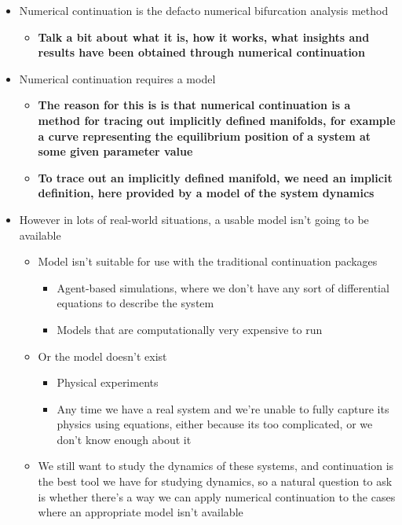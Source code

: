 \documentclass[11pt]{article}
\begin{document}
\begin{itemize}
\item Numerical continuation is the defacto numerical bifurcation analysis method
\begin{itemize}
\item \textbf{Talk a bit about what it is, how it works, what insights and results have been obtained through numerical continuation}
\end{itemize}
\item Numerical continuation requires a model
\begin{itemize}
\item \textbf{The reason for this is is that numerical continuation is a method for tracing out implicitly defined manifolds, for example a curve representing the equilibrium position of a system at some given parameter value}
\item \textbf{To trace out an implicitly defined manifold, we need an implicit definition, here provided by a model of the system dynamics}
\end{itemize}
\item However in lots of real-world situations, a usable model isn't going to be available
\begin{itemize}
\item Model isn't suitable for use with the traditional continuation packages
\begin{itemize}
\item Agent-based simulations, where we don't have any sort of differential equations to describe the system
\item Models that are computationally very expensive to run
\end{itemize}
\item Or the model doesn't exist
\begin{itemize}
\item Physical experiments
\item Any time we have a real system and we're unable to fully capture its physics using equations, either because its too complicated, or we don't know enough about it
\end{itemize}
\item We still want to study the dynamics of these systems, and continuation is the best tool we have for studying dynamics, so a natural question to ask is whether there's a way we can apply numerical continuation to the cases where an appropriate model isn't available
\end{itemize}
\end{itemize}
\end{document}
